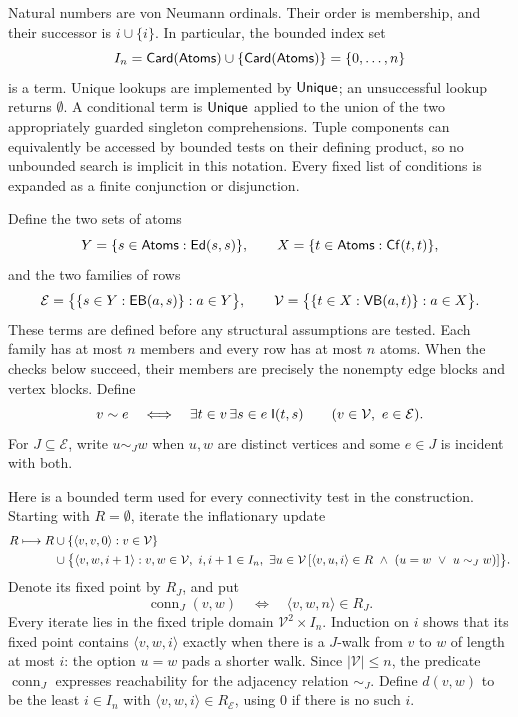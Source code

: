 Natural numbers are von Neumann ordinals. Their order is membership, and
their successor is \(i\cup\{i\}\). In particular, the bounded index set
\[
 I_n=\mathsf{Card}(\mathsf{Atoms})\cup\{\mathsf{Card}(\mathsf{Atoms})\}=\{0,\ldots,n\}
\]
is a term. Unique lookups are implemented by \(\mathsf{Unique}\); an unsuccessful
lookup returns \(\emptyset\). A conditional term is \(\mathsf{Unique}\) applied
to the union of the two appropriately guarded singleton comprehensions.
Tuple components can equivalently be accessed by bounded tests on their
defining product, so no unbounded search is implicit in this notation.
Every fixed list of conditions is expanded as a finite conjunction or
disjunction.

Define the two sets of atoms
\[
 Y=\{s\in\mathsf{Atoms}:\mathsf{Ed}(s,s)\},\qquad
 X=\{t\in\mathsf{Atoms}:\mathsf{Cf}(t,t)\},
\]
and the two families of rows
\[
 \mathcal E=\bigl\{\{s\in Y:\mathsf{EB}(a,s)\}:a\in Y\bigr\},\qquad
 \mathcal V=\bigl\{\{t\in X:\mathsf{VB}(a,t)\}:a\in X\bigr\}.
\]
These terms are defined before any structural assumptions are tested.
Each family has at most \(n\) members and every row has at most \(n\)
atoms. When the checks below succeed, their members are precisely the
nonempty edge blocks and vertex blocks. Define
\[
 v\sim e
 \quad\Longleftrightarrow\quad
 \exists t\in v\,\exists s\in e\;\mathsf I(t,s)
 \qquad(v\in\mathcal V,\ e\in\mathcal E).
\]
For \(J\subseteq\mathcal E\), write \(u\sim_Jw\) when \(u,w\) are
distinct vertices and some \(e\in J\) is incident with both.

Here is a bounded term used for every connectivity test in the
construction. Starting with \(R=\emptyset\), iterate the inflationary
update
\begin{align}
 R\longmapsto R
 &\cup\{\langle v,v,0\rangle:v\in\mathcal V\}\notag\\
 &\cup\bigl\{\langle v,w,i+1\rangle:
       v,w\in\mathcal V,\ i,i+1\in I_n,\ 
       \exists u\in\mathcal V\,
       [\langle v,u,i\rangle\in R\ \land\
        (u=w\ \lor\ u\sim_Jw)]\bigr\}.
 \label{sen:distance-iteration}
\end{align}
Denote its fixed point by \(R_J\), and put
\[
 \operatorname{conn}_J(v,w)
 \quad\Longleftrightarrow\quad
 \langle v,w,n\rangle\in R_J.
\]
Every iterate lies in the fixed triple domain
\(\mathcal V^2\times I_n\). Induction on \(i\) shows that its fixed point
contains \(\langle v,w,i\rangle\) exactly when there is a \(J\)-walk from
\(v\) to \(w\) of length at most \(i\): the option \(u=w\) pads a shorter
walk. Since \(|\mathcal V|\leq n\), the predicate
\(\operatorname{conn}_J\) expresses reachability for the adjacency relation \(\sim_J\). Define \(d(v,w)\) to be the least \(i\in I_n\) with
\(\langle v,w,i\rangle\in R_{\mathcal E}\), using \(0\) if there is no
such \(i\).


